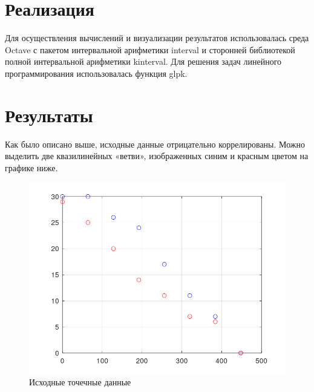 \documentclass[a4paper]{article}
\begin{document}
\section{Реализация}
Для осуществления вычислений и визуализации результатов использовалась среда Octave с пакетом интервальной арифметики interval и сторонней библиотекой полной интервальной арифметики kinterval. Для решения задач линейного программирования использовалась функция glpk.
\section{Результаты}
Как было описано выше, исходные данные отрицательно коррелированы. Можно выделить две квазилинейных «ветви», изображенных синим и красным цветом на графике ниже.
\begin{figure}[H]
    \centering
    \includegraphics[width=15cm]{img/data.png}
    \caption{Исходные точечные данные}
    \label{fig:data}
\end{figure}
\end{document}

